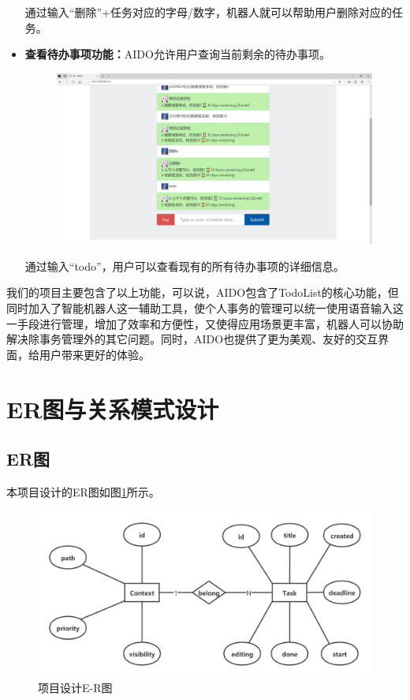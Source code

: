 \documentclass[logo,reportComp]{thesis}
\begin{document}
\begin{itemize}
通过输入“删除”+任务对应的字母/数字，机器人就可以帮助用户删除对应的任务。
\item \textbf{查看待办事项功能：}AIDO允许用户查询当前剩余的待办事项。
\begin{figure}[H]
\centering
\includegraphics[width=\linewidth]{fig/ask_task}
\end{figure}

通过输入“todo”，用户可以查看现有的所有待办事项的详细信息。
\end{itemize}

我们的项目主要包含了以上功能，可以说，AIDO包含了TodoList的核心功能，但同时加入了智能机器人这一辅助工具，使个人事务的管理可以统一使用语音输入这一手段进行管理，增加了效率和方便性，又使得应用场景更丰富，机器人可以协助解决除事务管理外的其它问题。同时，AIDO也提供了更为美观、友好的交互界面，给用户带来更好的体验。

\section{ER图与关系模式设计}
\subsection{ER图}

本项目设计的ER图如图\ref{fig:er}所示。
\begin{figure}[H]
\centering
\includegraphics[width=\linewidth]{fig/er_design}
\caption{项目设计E-R图}
\label{fig:er}
\end{figure}
\end{document}
